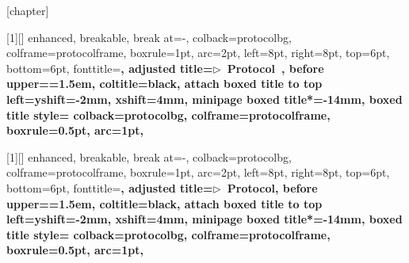 [chapter]
\renewcommand{\theclinicalfindingcounter}{\thechapter.\arabic{clinicalfindingcounter}}


%

\newcommand{\protocolicon}{\ensuremath{\triangleright}}

[1][]{%
  enhanced,
  breakable,
  break at=-\baselineskip,
  colback=protocolbg,
  colframe=protocolframe,
  boxrule=1pt,
  arc=2pt,
  left=8pt,
  right=8pt,
  top=6pt,
  bottom=6pt,
  fonttitle=\bfseries\sffamily,
  adjusted title={\protocolicon~Protocol~\theprotocolcounter{}},
  before upper={\parindent=1.5em},
  coltitle=black,
  attach boxed title to top left={yshift=-2mm, xshift=4mm},
  minipage boxed title*=-14mm,
  boxed title style={
    colback=protocolbg,
    colframe=protocolframe,
    boxrule=0.5pt,
    arc=1pt,
      }
}

[1][]{%
  enhanced,
  breakable,
  break at=-\baselineskip,
  colback=protocolbg,
  colframe=protocolframe,
  boxrule=1pt,
  arc=2pt,
  left=8pt,
  right=8pt,
  top=6pt,
  bottom=6pt,
  fonttitle=\bfseries\sffamily,
  adjusted title={\protocolicon~Protocol},
  before upper={\parindent=1.5em},
  coltitle=black,
  attach boxed title to top left={yshift=-2mm, xshift=4mm},
  minipage boxed title*=-14mm,
  boxed title style={
    colback=protocolbg,
    colframe=protocolframe,
    boxrule=0.5pt,
    arc=1pt,
      }
}

%
%

